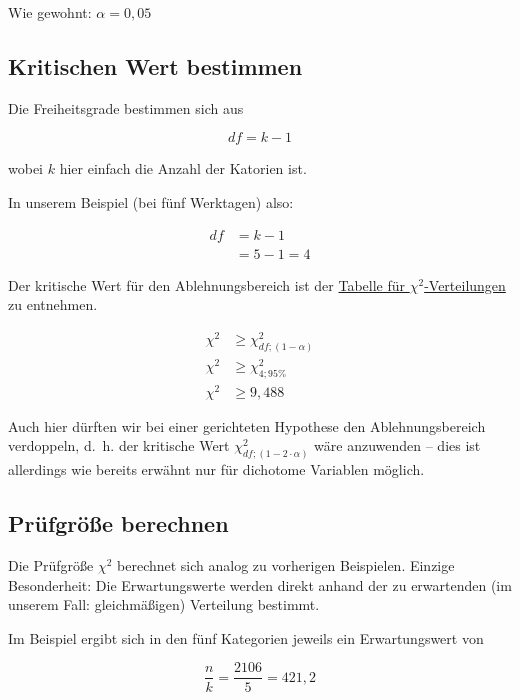 \documentclass[
  11pt,
  ngerman,
  a4paper,
]{report}
\begin{document}
Wie gewohnt: \(\alpha=0{,}05\)

\hypertarget{kritischen-wert-bestimmen-1}{%
\subsection{Kritischen Wert bestimmen}\label{kritischen-wert-bestimmen-1}}

Die Freiheitsgrade bestimmen sich aus

\[
\mathit{df}=k-1
\label{eq:dfe}
\]

wobei \(k\) hier einfach die Anzahl der Katorien ist.

In unserem Beispiel (bei fünf Werktagen) also:

\[
\begin{aligned}
\mathit{df}&=k-1\\
&=5-1=4
\end{aligned}
\]

Der kritische Wert für den Ablehnungsbereich ist der \protect\hyperlink{tabelle-chisq}{Tabelle für \(\chi^2\)-Verteilungen} zu entnehmen.

\[
\begin{aligned}
\chi^2 &\geq \chi^2_{\mathit{df};(1-\alpha)}\\
\chi^2 &\geq \chi^2_{4;95\%}\\
\chi^2 &\geq 9{,}488
\end{aligned}
\]

Auch hier dürften wir bei einer gerichteten Hypothese den Ablehnungsbereich verdoppeln, d.~h. der kritische Wert \(\chi^2_{\mathit{df};(1-2\cdot \alpha)}\) wäre anzuwenden -- dies ist allerdings wie bereits erwähnt nur für dichotome Variablen möglich.

\hypertarget{pruxfcfgruxf6uxdfe-berechnen-5}{%
\subsection{Prüfgröße berechnen}\label{pruxfcfgruxf6uxdfe-berechnen-5}}

Die Prüfgröße \(\chi^2\) berechnet sich analog zu vorherigen Beispielen. Einzige Besonderheit: Die Erwartungswerte werden direkt anhand der zu erwartenden (im unserem Fall: gleichmäßigen) Verteilung bestimmt.

Im Beispiel ergibt sich in den fünf Kategorien jeweils ein Erwartungswert von

\[\frac{n}{k}=\frac{2106}{5}=421{,}2\]
\end{document}
